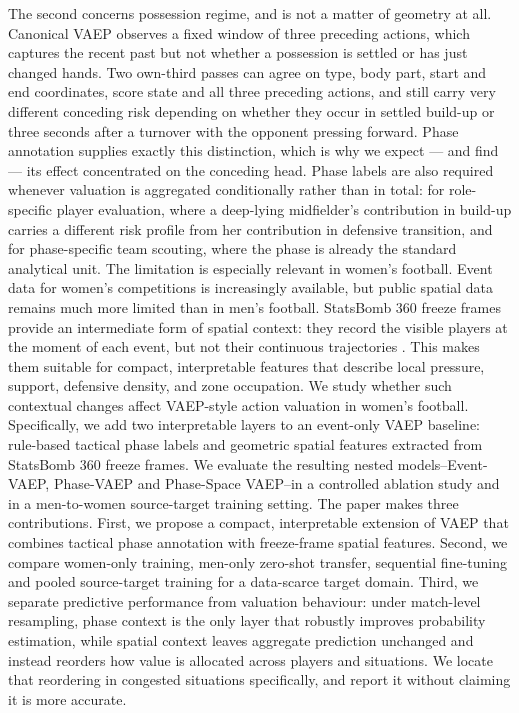 \documentclass[runningheads]{llncs}
\begin{document}
The second concerns possession regime, and is not a matter of geometry at all. Canonical VAEP observes a fixed window of three preceding actions, which captures the recent past but not whether a possession is settled or has just changed hands. Two own-third passes can agree on type, body part, start and end coordinates, score state and all three preceding actions, and still carry very different conceding risk depending on whether they occur in settled build-up or three seconds after a turnover with the opponent pressing forward. Phase annotation supplies exactly this distinction, which is why we expect --- and find --- its effect concentrated on the conceding head. Phase labels are also required whenever valuation is aggregated conditionally rather than in total: for role-specific player evaluation, where a deep-lying midfielder's contribution in build-up carries a different risk profile from her contribution in defensive transition, and for phase-specific team scouting, where the phase is already the standard analytical unit.
The limitation is especially relevant in women's football. Event data for women's competitions is increasingly available, but public spatial data remains much more limited than in men's football. StatsBomb 360 freeze frames provide an intermediate form of spatial context: they record the visible players at the moment of each event, but not their continuous trajectories \cite{statsbomb2021freezeframe}. This makes them suitable for compact, interpretable features that describe local pressure, support, defensive density, and zone occupation.
We study whether such contextual changes affect VAEP-style action valuation in women's football. Specifically, we add two interpretable layers to an event-only VAEP baseline: rule-based tactical phase labels and geometric spatial features extracted from StatsBomb 360 freeze frames. We evaluate the resulting nested models--Event-VAEP, Phase-VAEP and Phase-Space VAEP--in a controlled ablation study and in a men-to-women source-target training setting.
The paper makes three contributions. First, we propose a compact, interpretable extension of VAEP that combines tactical phase annotation with freeze-frame spatial features. Second, we compare women-only training, men-only zero-shot transfer, sequential fine-tuning and pooled source-target training for a data-scarce target domain. Third, we separate predictive performance from valuation behaviour: under match-level resampling, phase context is the only layer that robustly improves probability estimation, while spatial context leaves aggregate prediction unchanged and instead reorders how value is allocated across players and situations. We locate that reordering in congested situations specifically, and report it without claiming it is more accurate.
\end{document}
